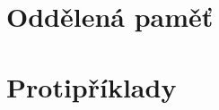 \section{Oddělená paměť}
\label{sec:oddelena-pamet}

\section{Protipříklady}
\label{sec:frama-c-counterexamples}




